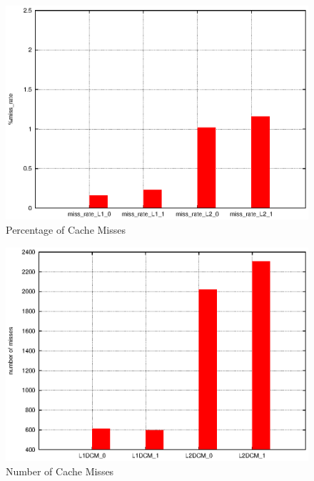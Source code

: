 \documentclass[a4paper,10pt,openright,openbib,twocolumn]{article}
\begin{document}
\begin{figure}[!htp]
	\centering
	\begin{minipage}[t]{\linewidth}
		\includegraphics[width=\linewidth]{images/caches.eps}
		\caption{Percentage of Cache Misses }
	\end{minipage}
\end{figure}
\begin{figure}[!htp]
	\centering
	\begin{minipage}[t]{\linewidth}
		\includegraphics[width=\linewidth]{images/misses.eps}
		\caption{Number of Cache Misses }
	\end{minipage}
\end{figure} 
\end{document}
